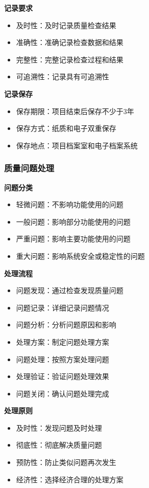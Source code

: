 \documentclass[UTF8,a4paper,zihao=-4]{ctexart}
\begin{document}
\textbf{记录要求}
\begin{itemize}
    \item 及时性：及时记录质量检查结果
    \item 准确性：准确记录检查数据和结果
    \item 完整性：完整记录检查过程和结果
    \item 可追溯性：记录具有可追溯性
\end{itemize}

\textbf{记录保存}
\begin{itemize}
    \item 保存期限：项目结束后保存不少于3年
    \item 保存方式：纸质和电子双重保存
    \item 保存地点：项目档案室和电子档案系统
\end{itemize}

\subsubsection{质量问题处理}
\textbf{问题分类}
\begin{itemize}
    \item 轻微问题：不影响功能使用的问题
    \item 一般问题：影响部分功能使用的问题
    \item 严重问题：影响主要功能使用的问题
    \item 重大问题：影响系统安全或稳定性的问题
\end{itemize}

\textbf{处理流程}
\begin{itemize}
    \item 问题发现：通过检查发现质量问题
    \item 问题记录：详细记录问题情况
    \item 问题分析：分析问题原因和影响
    \item 处理方案：制定问题处理方案
    \item 问题处理：按照方案处理问题
    \item 处理验证：验证问题处理效果
    \item 问题关闭：确认问题处理完成
\end{itemize}

\textbf{处理原则}
\begin{itemize}
    \item 及时性：发现问题及时处理
    \item 彻底性：彻底解决质量问题
    \item 预防性：防止类似问题再次发生
    \item 经济性：选择经济合理的处理方案
\end{itemize}
\end{document}
